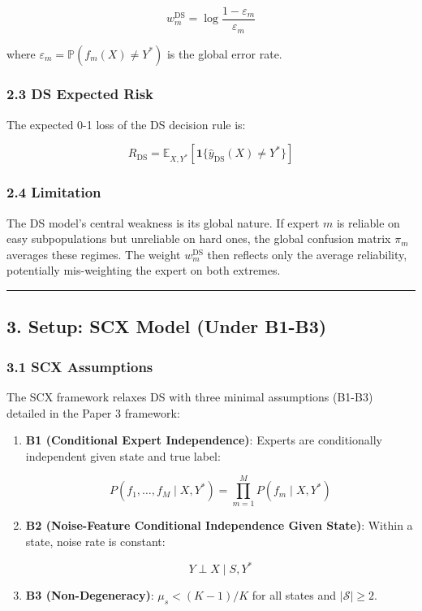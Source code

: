 \documentclass[
  12pt,
]{ctexart}
\begin{document}
\[w_m^{\text{DS}} = \log\frac{1 - \varepsilon_m}{\varepsilon_m}\]

where \(\varepsilon_m = \mathbb{P}(f_m(X) \neq Y^*)\) is the global
error rate.

\subsubsection{2.3 DS Expected Risk}\label{ds-expected-risk}

The expected 0-1 loss of the DS decision rule is:

\[R_{\text{DS}} = \mathbb{E}_{X, Y^*}\left[ \mathbf{1}\{\hat{y}_{\text{DS}}(X) \neq Y^*\} \right]\]

\subsubsection{2.4 Limitation}\label{limitation}

The DS model's central weakness is its global nature. If expert \(m\) is
reliable on easy subpopulations but unreliable on hard ones, the global
confusion matrix \(\pi_m\) averages these regimes. The weight
\(w_m^{\text{DS}}\) then reflects only the average reliability,
potentially mis-weighting the expert on both extremes.

\begin{center}\rule{0.5\linewidth}{0.5pt}\end{center}

\subsection{3. Setup: SCX Model (Under
B1-B3)}\label{setup-scx-model-under-b1-b3}

\subsubsection{3.1 SCX Assumptions}\label{scx-assumptions}

The SCX framework relaxes DS with three minimal assumptions (B1-B3)
detailed in the Paper 3 framework:

\begin{enumerate}
\def\labelenumi{\arabic{enumi}.}
\item
  \textbf{B1 (Conditional Expert Independence)}: Experts are
  conditionally independent given state and true label:

  \[P(f_1, \dots, f_M \mid X, Y^*) = \prod_{m=1}^M P(f_m \mid X, Y^*)\]
\item
  \textbf{B2 (Noise-Feature Conditional Independence Given State)}:
  Within a state, noise rate is constant:

  \[Y \perp X \mid S, Y^*\]
\item
  \textbf{B3 (Non-Degeneracy)}: \(\mu_s < (K-1)/K\) for all states and
  \(|\mathcal{S}| \geq 2\).
\end{enumerate}
\end{document}
